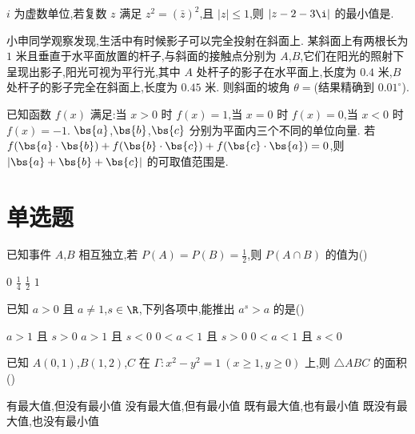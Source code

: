 \begin{problem}
\(i\) 为虚数单位,若复数 \(z\) 满足 \(z^2=(\bar z)^2\),且 \(|z|\le1\),则 \(|z-2-3\i|\) 的最小值是\fillinblank{}.
\end{problem}

\begin{problem}
小申同学观察发现,生活中有时候影子可以完全投射在斜面上. 某斜面上有两根长为 \(1\) 米且垂直于水平面放置的杆子,与斜面的接触点分别为 \(A\),\(B\),它们在阳光的照射下呈现出影子,阳光可视为平行光,其中 \(A\) 处杆子的影子在水平面上,长度为 \(0.4\) 米,\(B\) 处杆子的影子完全在斜面上,长度为 \(0.45\) 米. 则斜面的坡角 \(\theta=\)\fillinblank{}(结果精确到 \(0.01^\circ\)).

\end{problem}

\begin{problem}
已知函数 \(f(x)\) 满足:当 \(x>0\) 时 \(f(x)=1\),当 \(x=0\) 时 \(f(x)=0\),当 \(x<0\) 时 \(f(x)=-1\). \(\bs{a}\),\(\bs{b}\),\(\bs{c}\) 分别为平面内三个不同的单位向量. 若 \(f(\bs{a}\cdot\bs{b})+f(\bs{b}\cdot\bs{c})+f(\bs{c}\cdot\bs{a})=0\),则 \(|\bs{a}+\bs{b}+\bs{c}|\) 的可取值范围是\fillinblank{}.
\end{problem}

\section{单选题}

\begin{problem}
已知事件 \(A\),\(B\) 相互独立,若 \(P(A)=P(B)=\frac{1}{2}\),则 \(P(A\cap B)\) 的值为(\quad)

\choices
    {\(0\)}
    {\(\frac{1}{4}\)}
    {\(\frac{1}{2}\)}
    {\(1\)}
\end{problem}

\begin{problem}
已知 \(a>0\) 且 \(a\ne1\),\(s\in\R\),下列各项中,能推出 \(a^s>a\) 的是(\quad)

\choices
    {\(a>1\) 且 \(s>0\)}
    {\(a>1\) 且 \(s<0\)}
    {\(0<a<1\) 且 \(s>0\)}
    {\(0<a<1\) 且 \(s<0\)}
\end{problem}

\begin{problem}
已知 \(A(0,1)\),\(B(1,2)\),\(C\) 在 \(\Gamma:x^2-y^2=1\ (x\ge1,y\ge0)\) 上,则 \(\triangle ABC\) 的面积(\quad)

\choices
    {有最大值,但没有最小值}
    {没有最大值,但有最小值}
    {既有最大值,也有最小值}
    {既没有最大值,也没有最小值}
\end{problem}

